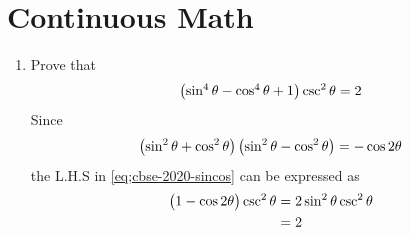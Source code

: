 \documentclass[journal,12pt,twocolumn]{IEEEtran}
\begin{document}
\section{Continuous Math}
\begin{enumerate}[label=3.\arabic*]
    \item Prove that
	    \begin{align}
		    \label{eq;cbse-2020-sincos}
    \begin{pmatrix}\sin^4\theta  - \cos^4\theta + 1\end{pmatrix} \csc^2\theta = 2
		    \end{align}
    \solution Since 
	    \begin{align}
\left(\sin^2\theta  + \cos^2\theta \right)
\left(\sin^2\theta  - \cos^2\theta \right)
= -\cos 2 \theta
		    \end{align}
		    the L.H.S in 
		    \eqref{eq;cbse-2020-sincos}
		    can be expressed as 
	    \begin{align}
		    \label{eq;cbse-2020-sincos_simp}
		    \begin{pmatrix}1-\cos2\theta\end{pmatrix} \csc^2\theta &= 
2 \sin^2 \theta \csc^2\theta 
\\
		    &= 2
		    \end{align}
    

\end{enumerate}
\end{document}
